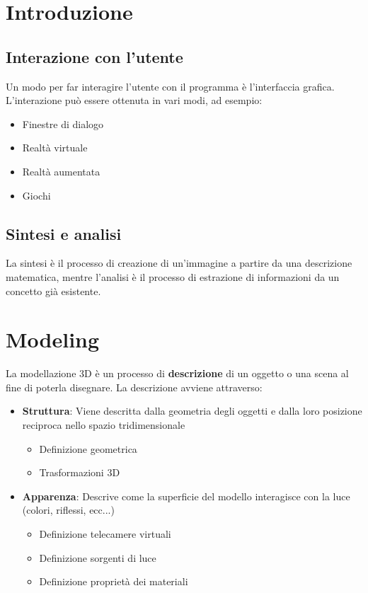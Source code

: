 \documentclass[a4paper]{article}
\begin{document}


\tableofcontents
\pagebreak

\section{Introduzione}

\subsection{Interazione con l'utente}
Un modo per far interagire l'utente con il programma è l'interfaccia grafica. L'interazione
può essere ottenuta in vari modi, ad esempio:
\begin{itemize}
    \item Finestre di dialogo
    \item Realtà virtuale
    \item Realtà aumentata
    \item Giochi
\end{itemize}

\subsection{Sintesi e analisi}
La sintesi è il processo di creazione di un'immagine a partire da una descrizione matematica,
mentre l'analisi è il processo di estrazione di informazioni da un concetto già esistente.

\section{Modeling}
La modellazione 3D è un processo di \textbf{descrizione} di un oggetto o una scena al fine
di poterla disegnare. La descrizione avviene attraverso:
\begin{itemize}
  \item \textbf{Struttura}: Viene descritta dalla geometria degli oggetti e dalla loro
    posizione reciproca nello spazio tridimensionale
    \begin{itemize}
      \item Definizione geometrica
      \item Trasformazioni 3D
    \end{itemize}

  \item \textbf{Apparenza}: Descrive come la superficie del modello interagisce con
    la luce (colori, riflessi, ecc...)
    \begin{itemize}
      \item Definizione telecamere virtuali
      \item Definizione sorgenti di luce
      \item Definizione proprietà dei materiali
    \end{itemize}
\end{itemize}
\end{document}
